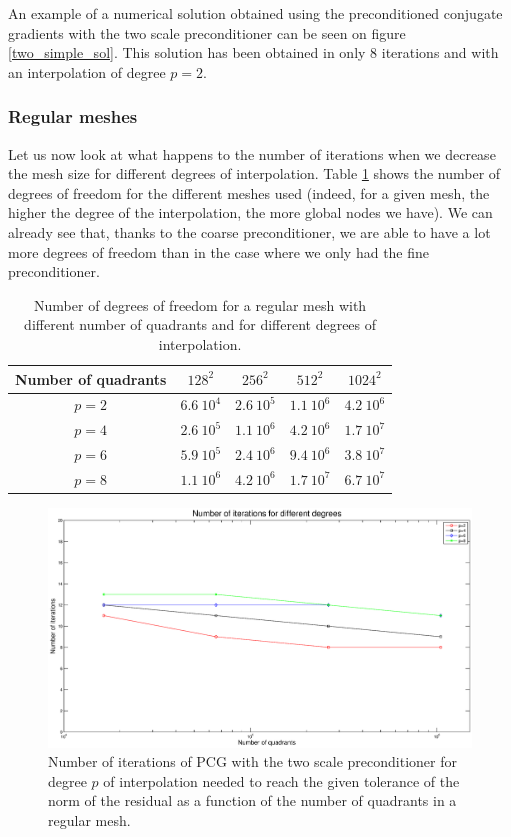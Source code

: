 An example of a numerical solution obtained using the preconditioned conjugate gradients with the two scale preconditioner can be seen on figure \ref{two_simple_sol}. This solution has been obtained in only 8 iterations and with an interpolation of degree $p=2$. 

\subsubsection{Regular meshes}

Let us now look at what happens to the number of iterations when we decrease the mesh size for different degrees of interpolation. Table \ref{two_table_reg} shows the number of degrees of freedom for the different meshes used (indeed, for a given mesh, the higher the degree of the interpolation, the more global nodes we have). We can already see that, thanks to the coarse preconditioner, we are able to have a lot more degrees of freedom than in the case where we only had the fine preconditioner.

\begin{table}
\centering
\begin{tabular}{c|cccc}
\hline
Number of quadrants & $128^2$ & $256^2$ & $512^2$ & $1024^2$\\
\hline
$p=2$ & $6.6\:10^4$ & $2.6\:10^5$ & $1.1\:10^6$ & $4.2\:10^6$ \\
$p=4$ & $2.6\:10^5$ & $1.1\:10^6$ & $4.2\:10^6$ & $1.7\:10^7$ \\
$p=6$ & $5.9\:10^5$ & $2.4\:10^6$ & $9.4\:10^6$ & $3.8\:10^7$ \\
$p=8$ & $1.1\:10^6$ & $4.2\:10^6$ & $1.7\:10^7$ & $6.7\:10^7$ \\
\hline
\end{tabular}
\caption{Number of degrees of freedom for a regular mesh with different number of quadrants and for different degrees of interpolation.}
\label{two_table_reg}
\end{table}

\begin{figure}
\centering
\includegraphics[scale=0.35]{Results/two_reg_iter.eps}
\caption{Number of iterations of PCG with the two scale preconditioner for degree $p$ of interpolation needed to reach the given tolerance of the norm of the residual as a function of the number of quadrants in a regular mesh.}
\label{two_reg_iter}
\end{figure}

